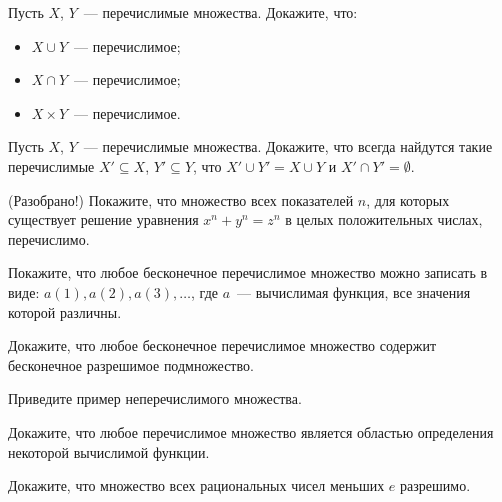 \setcounter{curtask}{1}


\begin{task}
    Пусть $X$, $Y$~--- перечислимые множества. Докажите, что:
    \begin{itemize}
	    \item $X \cup Y$~--- перечислимое;
	    \item $X \cap Y$~--- перечислимое;
      	\item $X \times Y$~--- перечислимое.
    \end{itemize}
\end{task}

\begin{task}
    Пусть $X$, $Y$~--- перечислимые множества. Докажите, что всегда найдутся такие
    перечислимые $X' \subseteq X$, $Y' \subseteq Y$, что $X' \cup Y' = X \cup Y$ и
    $X' \cap Y' = \emptyset$.
\end{task}

\begin{task} (Разобрано!)
    Покажите, что множество всех показателей $n$, для которых существует решение
    уравнения $x^n + y^n = z^n$ в целых положительных числах, перечислимо.
\end{task}

\begin{task}
    Покажите, что любое бесконечное перечислимое множество можно
    записать в виде: ${a(1), a(2), a(3), \dots}$, где $a$~---
    вычислимая функция, все значения которой различны.
\end{task}

\begin{task}
    Докажите, что любое бесконечное перечислимое множество содержит бесконечное
    разрешимое подмножество.
\end{task}

\begin{task}
    Приведите пример неперечислимого множества.
\end{task}

\begin{task}
    Докажите, что любое перечислимое множество является областью определения
    некоторой вычислимой функции.
\end{task}

\begin{task}
    Докажите, что множество всех рациональных чисел меньших $e$ разрешимо.
\end{task}